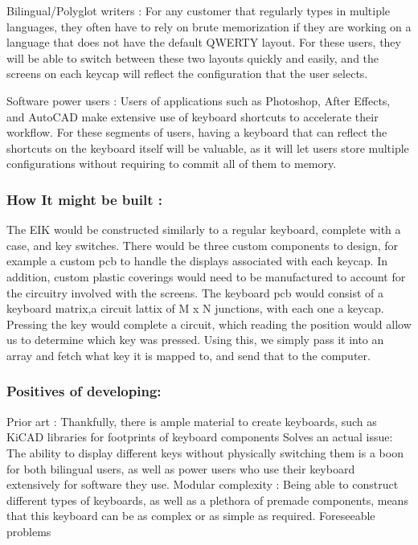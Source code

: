 \documentclass[11pt]{article}
\begin{document}
Bilingual/Polyglot writers : For any customer that regularly types in multiple languages, they often have to rely on brute memorization if they are working on a language that does not have the default QWERTY layout.  For these users, they will be able to switch between these two layouts quickly and easily, and the screens on each keycap will reflect the configuration that the user selects. 

Software power users : Users of applications such as Photoshop, After Effects, and AutoCAD make extensive use of keyboard shortcuts to accelerate their workflow.  For these segments of users, having a keyboard that can reflect the shortcuts on the keyboard itself will be valuable, as it will let users store multiple configurations without requiring to commit all of them to memory.

\subsubsection{How It might be built :}
\label{sec:org616499c}
The EIK would be constructed similarly to a regular keyboard, complete with a case, and key switches. There would be three custom components to design, for example a custom pcb to handle the displays associated with each keycap.  In addition, custom plastic coverings would need to be manufactured to account for the circuitry involved with the screens.
    The keyboard pcb would consist of a keyboard matrix,a circuit lattix of M x N junctions, with each one a keycap.  Pressing the key would complete a circuit, which reading the position would allow us to determine which key was pressed.  Using this, we simply pass it into an array and fetch what key it is mapped to, and send that to the computer.

\subsubsection{Positives of developing:}
\label{sec:org4473c3f}
Prior art : Thankfully, there is ample material to create keyboards, such as KiCAD libraries for footprints of keyboard components
Solves an actual issue: The ability to display different keys without physically switching them is a boon for both bilingual users, as well as power users who use their keyboard extensively for software they use.
Modular complexity : Being able to construct different types of keyboards, as well as a plethora of premade components, means that this keyboard can be as complex or as simple as required.
Foreseeable problems
\end{document}
